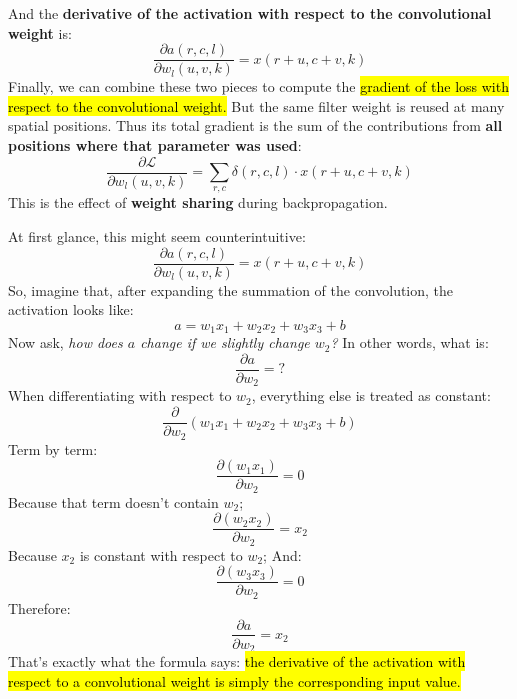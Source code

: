 And the \textbf{derivative of the activation with respect to the convolutional weight} is:
\begin{equation*}
    \frac{\partial a(r,c,l)}{\partial w_{l}(u,v,k)} = x(r+u, c+v, k)
\end{equation*}
Finally, we can combine these two pieces to compute the \hl{gradient of the loss with respect to the convolutional weight.} But the same filter weight is reused at many spatial positions. Thus its total gradient is the sum of the contributions from \textbf{all positions where that parameter was used}:
\begin{equation}\label{eq:gradient-of-loss-wrt-conv-weight}
    \frac{\partial\mathcal{L}}{\partial w_{l}(u,v,k)} = \sum_{r,c} \delta(r, c, l) \cdot x(r+u, c+v, k)
\end{equation}
This is the effect of \textbf{weight sharing} during backpropagation.
\begin{deepeningbox}
    At first glance, this might seem counterintuitive:
    \begin{equation*}
        \frac{\partial a(r,c,l)}{\partial w_{l}(u,v,k)} = x(r+u, c+v, k)
    \end{equation*}
    So, imagine that, after expanding the summation of the convolution, the activation looks like:
    \begin{equation*}
        a = w_{1}x_{1} + w_{2}x_{2} + w_{3}x_{3} + b
    \end{equation*}
    Now ask, \emph{how does $a$ change if we slightly change $w_2$?} In other words, what is:
    \begin{equation*}
        \frac{\partial a}{\partial w_{2}} = ?
    \end{equation*}
    When differentiating with respect to $w_2$, everything else is treated as constant:
    \begin{equation*}
        \frac{\partial}{\partial w_2}
        (w_1x_1+w_2x_2+w_3x_3+b)
    \end{equation*}
    Term by term:
    \begin{equation*}
        \frac{\partial(w_1x_1)}{\partial w_2} = 0
    \end{equation*}
    Because that term doesn't contain $w_2$;
    \begin{equation*}
        \frac{\partial(w_2x_2)}{\partial w_2} = x_2
    \end{equation*}
    Because $x_2$ is constant with respect to $w_2$;
    And:
    \begin{equation*}
        \frac{\partial(w_3x_3)}{\partial w_2}=0
    \end{equation*}
    Therefore:
    \begin{equation*}
        \frac{\partial a}{\partial w_2}=x_2
    \end{equation*}
    That's exactly what the formula says: \hl{the derivative of the activation with respect to a convolutional weight is simply the corresponding input value.}
\end{deepeningbox}

